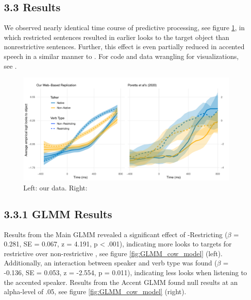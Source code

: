 

\subsection{3.3 Results}

 We observed nearly identical time course of predictive processing, see figure \ref{fig:smooth}, in which restricted sentences resulted in earlier looks to the target object than nonrestrictive sentences. Further, this effect is even partially reduced in accented speech in a similar manner to \textcite{Porretta_et_al_2020}. For  code and data wrangling for visualizations, see .

\begin{figure}[h]
    \centering
    \includegraphics[width=\textwidth]{figures/smooth_comparison_plot.pdf}
    \caption{Left: our data. Right: \textcite{Porretta_et_al_2020}}
    \label{fig:smooth}
\end{figure}

\subsection{3.3.1 GLMM Results}
Results from the Main GLMM revealed a significant effect of  -Restricting  ($\beta$ = 0.281, SE = 0.067, z = 4.191, p < .001), indicating more looks to targets for restrictive  over non-restrictive , see figure \ref{fig:GLMM_cow_model} (left). Additionally, an interaction between speaker and verb type was found ($\beta$ = -0.136, SE = 0.053, z = -2.554, p = 0.011), indicating less looks when listening to the accented speaker. Results from the Accent GLMM found null results at an alpha-level of .05, see figure \ref{fig:GLMM_cow_model} (right). 

